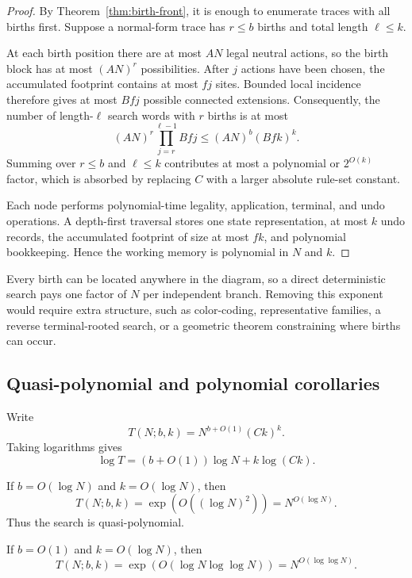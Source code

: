 \begin{proof}
By Theorem~\ref{thm:birth-front}, it is enough to enumerate traces with all
births first.  Suppose a normal-form trace has $r\leq b$ births and total length
$\ell\leq k$.

At each birth position there are at most $AN$ legal neutral actions, so the birth
block has at most $(AN)^r$ possibilities.  After $j$ actions have been chosen,
the accumulated footprint contains at most $fj$ sites.  Bounded local incidence
therefore gives at most $Bfj$ possible connected extensions.  Consequently,
the number of length-$\ell$ search words with $r$ births is at most
\[
  (AN)^r\prod_{j=r}^{\ell-1} Bfj
  \leq (AN)^b(Bfk)^k.
\]
Summing over $r\leq b$ and $\ell\leq k$ contributes at most a polynomial or
$2^{O(k)}$ factor, which is absorbed by replacing $C$ with a larger absolute
rule-set constant.

Each node performs polynomial-time legality, application, terminal, and undo
operations.  A depth-first traversal stores one state representation, at most
$k$ undo records, the accumulated footprint of size at most $fk$, and polynomial
bookkeeping.  Hence the working memory is polynomial in $N$ and $k$.
\end{proof}

\begin{remark}
Every birth can be located anywhere in the diagram, so a direct deterministic
search pays one factor of $N$ per independent branch.  Removing this exponent
would require extra structure, such as color-coding, representative families,
a reverse terminal-rooted search, or a geometric theorem constraining where
births can occur.
\end{remark}

\subsection{Quasi-polynomial and polynomial corollaries}

Write
\[
 T(N;b,k)=N^{b+O(1)}(Ck)^k.
\]
Taking logarithms gives
\[
 \log T=(b+O(1))\log N + k\log(Ck).
\]

\begin{corollary}
\label{cor:log-parameters}
If $b=O(\log N)$ and $k=O(\log N)$, then
\[
 T(N;b,k)=\exp(O((\log N)^2))=N^{O(\log N)}.
\]
Thus the search is quasi-polynomial.
\end{corollary}

\begin{corollary}
\label{cor:constant-branching}
If $b=O(1)$ and $k=O(\log N)$, then
\[
 T(N;b,k)=\exp(O(\log N\log\log N))
          =N^{O(\log\log N)}.
\]
\end{corollary}

